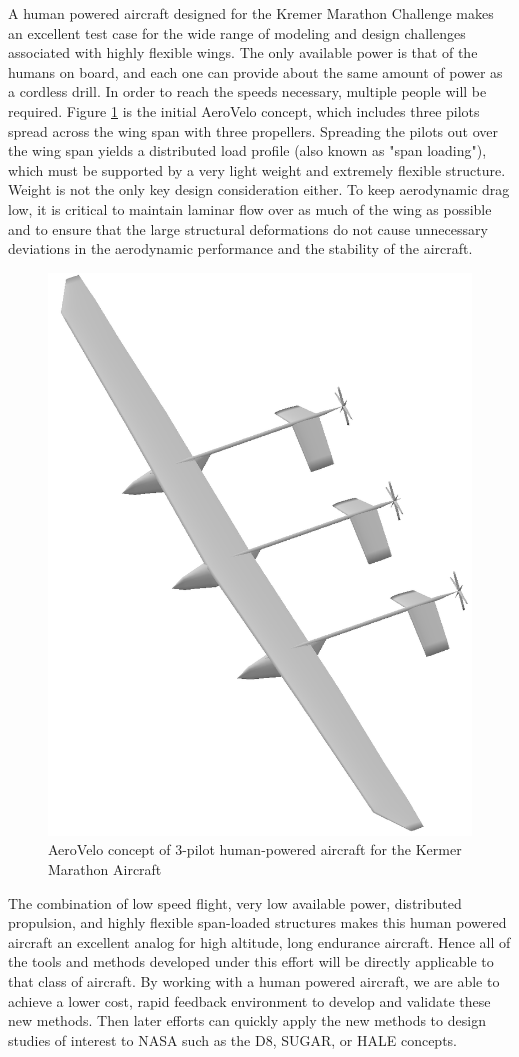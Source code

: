 \documentclass[]{aiaa-tc}
\begin{document}
    A human powered aircraft designed for the Kremer Marathon Challenge makes an excellent test case for the 
    wide range of modeling and design challenges associated with highly flexible wings. 
    The only available power is that of the humans on board, and each one can provide about the 
    same amount of power as a cordless drill. In order to reach the speeds necessary, multiple people will be required. 
    Figure \ref{fig:aerovelo-concept} is the initial AeroVelo concept, which includes three pilots spread across the wing
    span with three propellers. Spreading the pilots out over the wing span yields a distributed load profile (also known as "span loading"), 
    which must be supported by a very light weight and extremely flexible structure. Weight is not the only 
    key design consideration either. To keep aerodynamic drag low, it is critical to maintain laminar flow 
    over as much of the wing as possible and to ensure that the large structural deformations do not cause unnecessary deviations in the aerodynamic performance and the stability of the aircraft. 

    \begin{figure}[!hbt]
        \centering
        \includegraphics[width=.5\textwidth]{images/vsp_concept_solid}
        \caption{AeroVelo concept of 3-pilot human-powered aircraft for the Kermer Marathon Aircraft}
        \label{fig:aerovelo-concept}
    \end{figure}

    The combination of low speed flight, very low available power, distributed propulsion, and highly 
    flexible span-loaded structures makes this human powered aircraft an excellent analog for 
    high altitude, long endurance aircraft. Hence all of the tools and methods developed under 
    this effort will be directly applicable to that class of aircraft. By working with a human powered 
    aircraft, we are able to achieve a lower cost, rapid feedback environment to develop and validate these 
    new methods. Then later efforts can quickly apply the new methods to design studies of interest to NASA such as the D8, SUGAR,
    or HALE concepts. 
\end{document}
